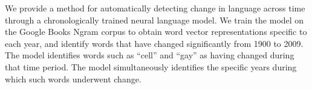 We provide a method for automatically detecting change in language across time through a chronologically trained neural language model. We train the model on the Google Books Ngram corpus to obtain word vector representations specific to each year, and identify words that have changed significantly from 1900 to 2009. The model identifies words such as ``cell'' and ``gay'' as having changed during that time period. The model simultaneously identifies the specific years during which such words underwent change.
